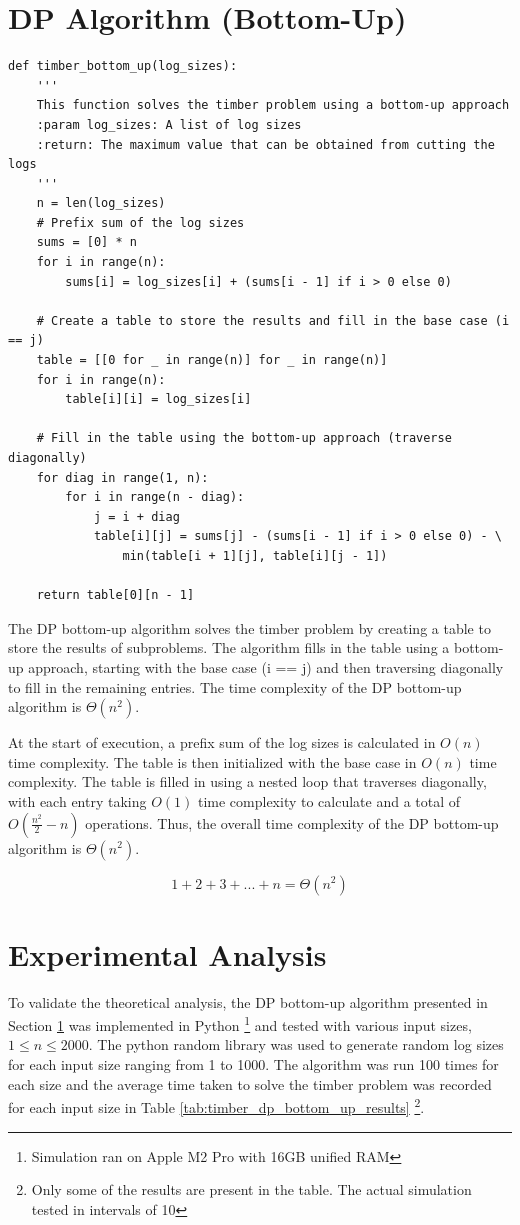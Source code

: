 \documentclass[12pt]{article}
\begin{document}
\section{DP Algorithm (Bottom-Up)}
\label{timber_bottom_up}
\begin{verbatim}
def timber_bottom_up(log_sizes):
    '''
    This function solves the timber problem using a bottom-up approach
    :param log_sizes: A list of log sizes
    :return: The maximum value that can be obtained from cutting the logs
    '''
    n = len(log_sizes)
    # Prefix sum of the log sizes
    sums = [0] * n
    for i in range(n):
        sums[i] = log_sizes[i] + (sums[i - 1] if i > 0 else 0)

    # Create a table to store the results and fill in the base case (i == j)
    table = [[0 for _ in range(n)] for _ in range(n)]
    for i in range(n):
        table[i][i] = log_sizes[i]

    # Fill in the table using the bottom-up approach (traverse diagonally)
    for diag in range(1, n):
        for i in range(n - diag):
            j = i + diag
            table[i][j] = sums[j] - (sums[i - 1] if i > 0 else 0) - \
                min(table[i + 1][j], table[i][j - 1])

    return table[0][n - 1]
\end{verbatim}

The DP bottom-up algorithm solves the timber problem by creating a table to store the results of subproblems. The algorithm fills in the table using a bottom-up approach, starting with the base case (i == j) and then traversing diagonally to fill in the remaining entries. The time complexity of the DP bottom-up algorithm is $\Theta(n^2)$.

At the start of execution, a prefix sum of the log sizes is calculated in $O(n)$ time complexity. The table is then initialized with the base case in $O(n)$ time complexity. The table is filled in using a nested loop that traverses diagonally, with each entry taking $O(1)$ time complexity to calculate and a total of $O(\frac{n^2}{2} - n)$ operations. Thus, the overall time complexity of the DP bottom-up algorithm is $\Theta(n^2)$.

\begin{equation}
    1 + 2 + 3 + ... + n = \Theta(n^2)
\end{equation}

\section{Experimental Analysis}
To validate the theoretical analysis, the DP bottom-up algorithm presented in Section \ref*{timber_bottom_up} was implemented in Python \footnote{Simulation ran on Apple M2 Pro with 16GB unified RAM} and tested with various input sizes, $1 \leq n \leq 2000$. The python random library was used to generate random log sizes for each input size ranging from 1 to 1000. The algorithm was run 100 times for each size and the average time taken to solve the timber problem was recorded for each input size in Table \ref{tab:timber_dp_bottom_up_results} \footnote{Only some of the results are present in the table. The actual simulation tested in intervals of 10}.
\end{document}
